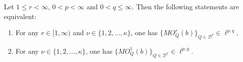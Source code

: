 \documentclass[12pt]{amsart}
\begin{document}
\begin{lemma}\label{technic}
Let $1\leq r<\infty$, $0<p<\infty$ and $0<q\leq \infty$. Then the following statements are equivalent:
\begin{enumerate}
  \item For any $r\in [1,\infty)$ and $\nu\in\{1,2,\ldots ,\kappa\}$, one has $\{MO_Q^r(b)\}_{Q\in\mathcal{D}^\nu}\in \ell^{p,q}$.
  \item For any $\nu\in\{1,2,\ldots ,\kappa\}$, one has $\{MO_Q^1(b)\}_{Q\in\mathcal{D}^\nu}\in \ell^{p,q}$.
\end{enumerate}

\end{lemma}
\end{document}
